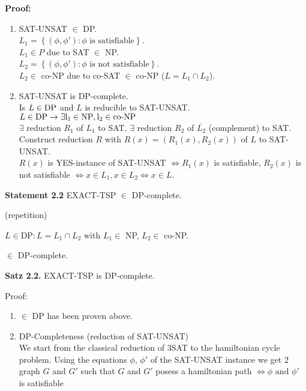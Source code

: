 \documentclass[a4paper]{article}
\newcommand{\cls}[1]{\rm{#1}}
\newcommand{\probl}[1]{\text{\textsc{#1}}}
\newcommand{\set}[1]{\left\{#1\right\}}
\begin{document}
\textbf{Proof:}
\begin{enumerate}
  \item SAT-UNSAT $\in$ \cls{DP}. \\
        $L_1 = \set{(\phi, \phi'): \phi \text{ is satisfiable}}$. \\
	$L_1 \in P$ due to SAT $\in$ \cls{NP}. \\
        $L_2 = \set{(\phi, \phi'): \phi \text{ is not satisfiable}}$. \\
        $L_2 \in$ \cls{co-NP} due to co-SAT $\in$ \cls{co-NP} ($L = L_1 \cap L_2$).
  \item SAT-UNSAT is \cls{DP}-complete. \\
        Is $L \in \cls{DP}$ and $L$ is reducible to SAT-UNSAT. \\
        $L \in \cls{DP} \rightarrow \exists l_1 \in \text{NP}, l_2 \in \text{co-NP}$ \\
	$\exists$ reduction $R_1$ of $L_1$ to SAT. $\exists$ reduction $R_2$ of $\overline{L_2}$ (complement) to SAT. \\
        Construct reduction $R$ with $R(x) = (R_1(x), R_2(x))$ of $L$ to SAT-UNSAT. \\
        $R(x)$ is YES-instance of SAT-UNSAT $\Leftrightarrow R_1(x)$ is satisfiable,
        $R_2(x)$ is not satisfiable $\Leftrightarrow x \in L_1, x \in L_2 \Leftrightarrow x \in L$.
\end{enumerate}

\textbf{Statement 2.2} EXACT-TSP $\in$ \cls{DP}-complete.

(repetition)

$L \in \text{DP}: L = L_1 \cap L_2$ with $L_1 \in$ \cls{NP}, $L_2 \in$ \cls{co-NP}.

\probl{SAT-UNSAT} $\in$ \cls{DP}-complete.

\textbf{Satz 2.2.} EXACT-TSP is \cls{DP}-complete.

Proof:
\begin{enumerate}
  \item \probl{EXACT-TSP} $\in$ \cls{DP} has been proven above.
  \item \cls{DP}-Completeness (reduction of SAT-UNSAT) \\
        We start from the classical reduction of 3SAT to the hamiltonian cycle problem.
        Using the equations $\phi$, $\phi'$ of the SAT-UNSAT instance
        we get 2 graph $G$ and $G'$ such that $G$ and $G'$ posess a hamiltonian path
        $\Leftrightarrow \phi \text{ and } \phi'$ is satisfiable
\end{enumerate}
\end{document}
